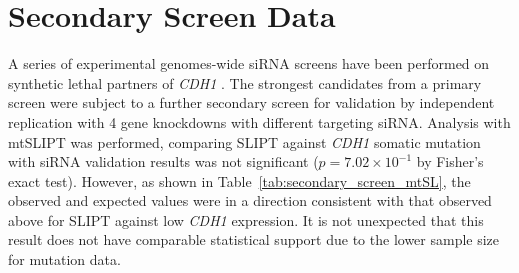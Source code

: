 



\iffalse
\chapter{Secondary Screen Data}
\label{appendix:secondary_screen}

A series of experimental \glspl{genome}-wide \gls{siRNA} screens have been performed on synthetic lethal partners of \textit{CDH1} \citep{Telford2015}. The strongest candidates from a primary screen were subject to a further secondary screen for validation by independent replication with 4 gene knockdowns with different targeting \gls{siRNA}. Analysis with \acrshort{mtSLIPT} was performed, comparing SLIPT against \textit{CDH1} somatic mutation with \gls{siRNA} validation results was not significant ($p=7.02 \times 10^{-1}$ by Fisher's exact test). However,  as shown in Table~\ref{tab:secondary_screen_mtSL}, the observed and expected values were in a direction consistent with that observed above for SLIPT against low \textit{CDH1} expression. It is not unexpected that this result does not have comparable statistical support due to the lower sample size for mutation data. 

